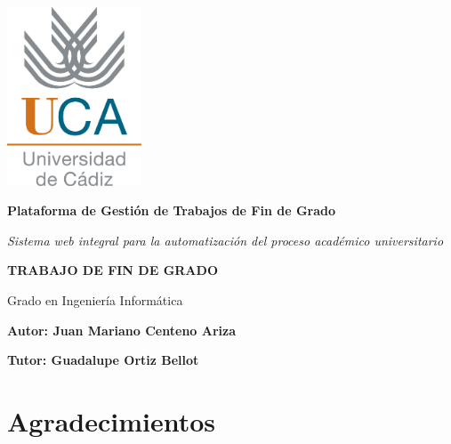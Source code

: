 
\begin{titlepage}
\centering

\includegraphics[width=0.3\textwidth]{images/logo-universidad.jpg}\par\vspace{1cm}

{\huge\bfseries Plataforma de Gestión de Trabajos de Fin de Grado\par}
\vspace{0.5cm}
{\Large\itshape Sistema web integral para la automatización del proceso académico universitario\par}

\vspace{2cm}

{\Large\textbf{TRABAJO DE FIN DE GRADO}\par}
\vspace{0.5cm}
{\large Grado en Ingeniería Informática\par}

\vspace{2.5cm}

\begin{minipage}[t]{0.4\textwidth}
\begin{flushleft}
\large
\textbf{Autor: Juan Mariano Centeno Ariza}
\end{flushleft}
\end{minipage}
\hfill
\begin{minipage}[t]{0.4\textwidth}
\begin{flushright}
\large
\textbf{Tutor: Guadalupe Ortiz Bellot}
\end{flushright}
\end{minipage}

\vfill

\end{titlepage}

\newpage
\chapter*{Agradecimientos}

